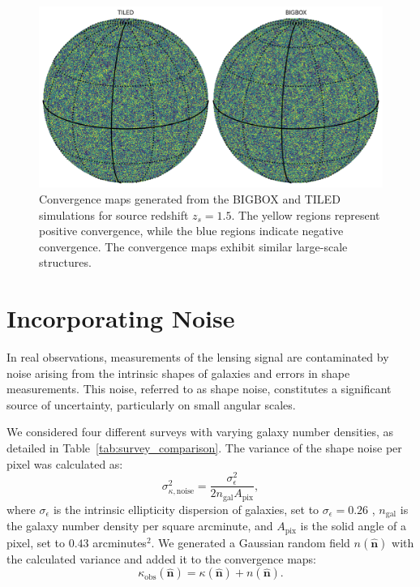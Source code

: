 \begin{figure}
    \centering
    \includegraphics[width=\textwidth]{figures/samplemap.png}
    \caption{Convergence maps generated from the BIGBOX and TILED simulations for source redshift $z_s = 1.5$. The yellow regions represent positive convergence, while the blue regions indicate negative convergence. The convergence maps exhibit similar large-scale structures.} \label{fig:convergence_maps}
\end{figure}


\section{Incorporating Noise}
In real observations, measurements of the lensing signal are contaminated by noise arising from the intrinsic shapes of galaxies and errors in shape measurements. This noise, referred to as shape noise, constitutes a significant source of uncertainty, particularly on small angular scales.

We considered four different surveys with varying galaxy number densities, as detailed in Table~\ref{tab:survey_comparison}.
The variance of the shape noise per pixel was calculated as:
\begin{equation}
    \sigma_{\kappa, \text{noise}}^2 = \frac{\sigma_{\epsilon}^2}{2 n_{\mathrm{gal}} A_{\mathrm{pix}}},
\end{equation}
where $\sigma_{\epsilon}$ is the intrinsic ellipticity dispersion of galaxies, set to $\sigma_{\epsilon} = 0.26$ \citep{2019A&A...627A..59E}, $n_{\mathrm{gal}}$ is the galaxy number density per square arcminute, and $A_{\mathrm{pix}}$ is the solid angle of a pixel, set to $0.43$ arcminutes$^2$.
We generated a Gaussian random field $n(\hat{\mathbf{n}})$ with the calculated variance and added it to the convergence maps:
\begin{equation}
    \kappa_{\mathrm{obs}}(\hat{\mathbf{n}}) = \kappa(\hat{\mathbf{n}}) + n(\hat{\mathbf{n}}).
\end{equation}

